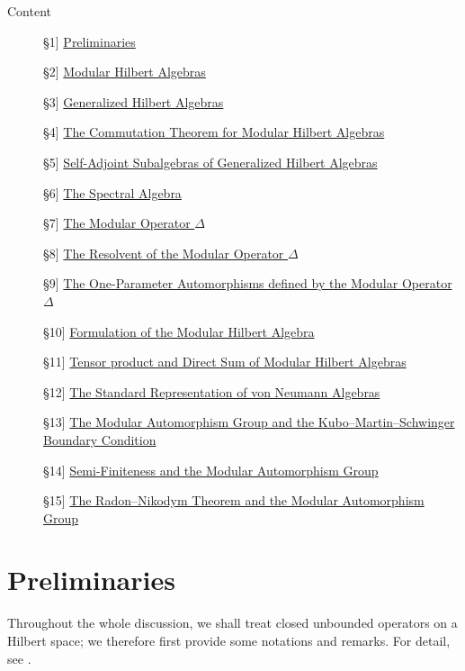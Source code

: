 \documentclass[12pt,b5paper,twoside]{article}
\theoremstyle{takesaki}
\numberwithin{equation}{section}
\newcommand{\secref}[1]{\hyperref[sec:#1]{\S#1}}
\begin{document}
\begin{center}
  \large Content
\end{center}
\begin{description}
\item[\secref{1}] \hyperref[sec:1]{Preliminaries}
\item[\secref{2}] \hyperref[sec:2]{Modular Hilbert Algebras}
\item[\secref{3}] \hyperref[sec:3]{Generalized Hilbert Algebras}
\item[\secref{4}] \hyperref[sec:4]{The Commutation Theorem for Modular Hilbert Algebras}
\item[\secref{5}] \hyperref[sec:5]{Self-Adjoint Subalgebras of Generalized Hilbert Algebras}
\item[\secref{6}] \hyperref[sec:6]{The Spectral Algebra}
\item[\secref{7}] \hyperref[sec:7]{The Modular Operator $\Delta$}
\item[\secref{8}] \hyperref[sec:8]{The Resolvent of the Modular Operator $\Delta$}
\item[\secref{9}] \hyperref[sec:9]{The One-Parameter Automorphisms defined by the Modular Operator $\Delta$}
\item[\secref{10}] \hyperref[sec:10]{Formulation of the Modular Hilbert Algebra}
\item[\secref{11}] \hyperref[sec:11]{Tensor product and Direct Sum of Modular Hilbert Algebras}

\item[\secref{12}] \hyperref[sec:12]{The Standard Representation of von Neumann Algebras}
\item[\secref{13}] \hyperref[sec:13]{The Modular Automorphism Group and the Kubo--Martin--Schwinger Boundary Condition}
\item[\secref{14}] \hyperref[sec:14]{Semi-Finiteness and the Modular Automorphism Group}
\item[\secref{15}] \hyperref[sec:15]{The Radon--Nikodym Theorem and the Modular Automorphism Group}
\end{description}

\section{Preliminaries}\label{sec:1}

Throughout the whole discussion, we shall treat closed unbounded
operators on a Hilbert space; we therefore first provide some notations
and remarks.  For detail, see \cite[Chapter~XII]{ref6}.
\end{document}
